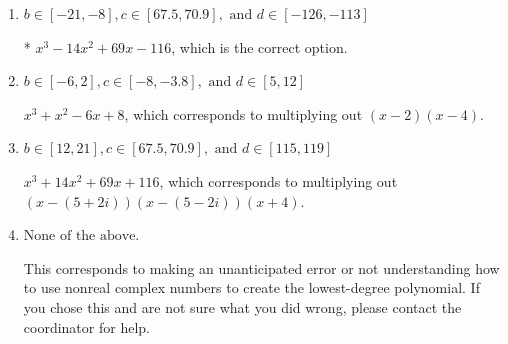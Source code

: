 \documentclass{extbook}[14pt]
\begin{document}
\begin{enumerate}
{\begin{enumerate}[label=\Alph*.]
$x^{3} + x^{2} -9 x + 20$, which corresponds to multiplying out $(x -5)(x -4)$.
\item \( b \in [-21, -8], c \in [67.5, 70.9], \text{ and } d \in [-126, -113] \)

* $x^{3} -14 x^{2} +69 x -116$, which is the correct option.
\item \( b \in [-6, 2], c \in [-8, -3.8], \text{ and } d \in [5, 12] \)

$x^{3} + x^{2} -6 x + 8$, which corresponds to multiplying out $(x -2)(x -4)$.
\item \( b \in [12, 21], c \in [67.5, 70.9], \text{ and } d \in [115, 119] \)

$x^{3} +14 x^{2} +69 x + 116$, which corresponds to multiplying out $(x-(5 + 2 i))(x-(5 - 2 i))(x + 4)$.
\item \( \text{None of the above.} \)

This corresponds to making an unanticipated error or not understanding how to use nonreal complex numbers to create the lowest-degree polynomial. If you chose this and are not sure what you did wrong, please contact the coordinator for help.
\end{enumerate}

}
\end{enumerate}
\end{document}
